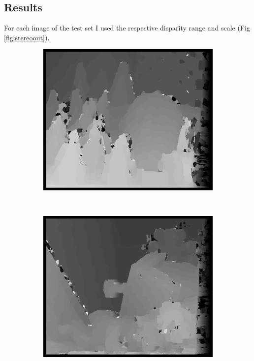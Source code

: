 \documentclass[letterpaper,12pt]{article}
\begin{document}
\subsection{Results}
	For each image of the test set I used the respective disparity range and scale (Fig \ref{fig:stereoout}).
\begin{figure}[!h]
        \centering
        \begin{subfigure}[b]{0.2\textwidth}
                \includegraphics[width=\textwidth]{conesO.png}
        \end{subfigure}%
        \quad
        ~ %
        \begin{subfigure}[b]{0.2\textwidth}
                \includegraphics[width=\textwidth]{teddyO.png}

\end{subfigure}
\end{figure}
\end{document}
